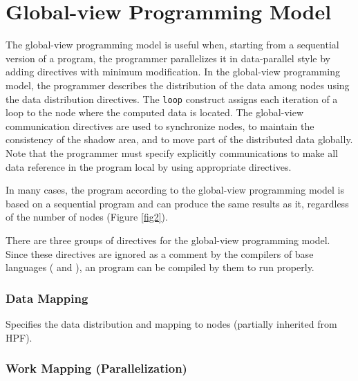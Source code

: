 \section{Global-view Programming Model}

The global-view programming model is useful when, starting from a
sequential version of a program, the programmer parallelizes it in
data-parallel style by adding directives with minimum modification.
%
In the global-view programming model, the programmer describes the
distribution of the data among nodes using the data distribution
directives.
%
The {\tt loop} construct assigns each iteration of a loop to the node
where the computed data is located. 
%
The global-view communication directives are used to synchronize nodes,
to maintain the consistency of the shadow area, and to move part of the
distributed data globally.
%
Note that the programmer must specify explicitly communications to make
all data reference in the program local by using appropriate directives.

In many cases, the {\XMP} program according to the global-view
programming model is based on a sequential program and can produce the
same results as it, regardless of the number of nodes (Figure
\ref{fig2}).

There are three groups of directives for the global-view programming
model. Since these directives are ignored as a comment by the
compilers of base languages ({\Fort} and {\C}), an {\XMP} program can be
compiled by them to run properly.


\subsubsection*{Data Mapping}

Specifies the data distribution and mapping to nodes (partially
inherited from HPF).

\subsubsection*{Work Mapping (Parallelization)}

